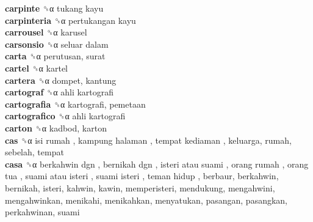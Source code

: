\textbf{carpinte} ␝α   tukang kayu   \\
\textbf{carpinteria} ␝α   pertukangan kayu   \\
\textbf{carrousel} ␝α  karusel  \\
\textbf{carsonsio} ␝α   seluar dalam   \\
\textbf{carta} ␝α  perutusan, surat  \\
\textbf{cartel} ␝α  kartel  \\
\textbf{cartera} ␝α  dompet, kantung  \\
\textbf{cartograf} ␝α   ahli kartografi   \\
\textbf{cartografia} ␝α  kartografi, pemetaan  \\
\textbf{cartografico} ␝α   ahli kartografi   \\
\textbf{carton} ␝α  kadbod, karton  \\
\textbf{cas} ␝α   isi rumah ,  kampung halaman ,  tempat kediaman , keluarga, rumah, sebelah, tempat  \\
\textbf{casa} ␝α   berkahwin dgn ,  bernikah dgn ,  isteri atau suami ,  orang rumah ,  orang tua ,  suami atau isteri ,  suami isteri ,  teman hidup , berbaur, berkahwin, bernikah, isteri, kahwin, kawin, memperisteri, mendukung, mengahwini, mengahwinkan, menikahi, menikahkan, menyatukan, pasangan, pasangkan, perkahwinan, suami  \\
